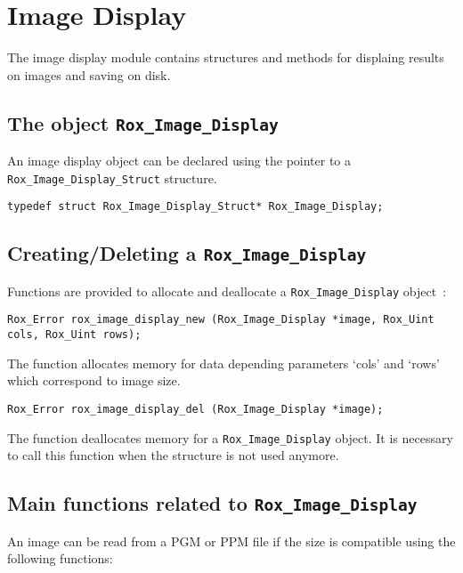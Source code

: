 \section{Image Display}
\label{sec:idisp}

The image display module contains structures and methods for displaing results on images and saving on disk. 

\subsection{The object {\tt Rox\_Image\_Display}}
\label{sse:idisp_object}

An image display object can be declared using the pointer to a \lstinline$Rox_Image_Display_Struct$ structure. 
\begin{lstlisting}
typedef struct Rox_Image_Display_Struct* Rox_Image_Display;
\end{lstlisting}

\subsection{Creating/Deleting a {\tt Rox\_Image\_Display}}
\label{sse:idisp_newdel}

Functions are provided to allocate and deallocate a \lstinline$Rox_Image_Display$ object~:

\begin{lstlisting}
Rox_Error rox_image_display_new (Rox_Image_Display *image, Rox_Uint cols, Rox_Uint rows);
\end{lstlisting}

The function allocates memory for data depending parameters  `cols' and `rows' which correspond to image size.\\

\begin{lstlisting}
Rox_Error rox_image_display_del (Rox_Image_Display *image);
\end{lstlisting}

The function deallocates memory for a \lstinline$Rox_Image_Display$ object. It is necessary to call this function when the
structure is not used anymore.

\subsection{Main functions related to {\tt Rox\_Image\_Display}}
\label{sse:idisp_functs}

An image can be read from a PGM or PPM file if the size is compatible using the following functions:

